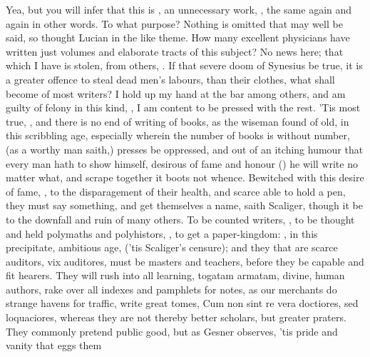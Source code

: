 {Yea, but you will infer that this is , an unnecessary
work, , the same again and again in other
words. To what purpose? Nothing is omitted that may well be said,
so thought Lucian in the like theme. How many excellent physicians have
written just volumes and elaborate tracts of this subject? No news
here; that which I have is stolen, from others, . If that severe doom of Synesius be true, it is a
greater offence to steal dead men's labours, than their clothes, what
shall become of most writers? I hold up my hand at the bar among
others, and am guilty of felony in this kind, , I
am content to be pressed with the rest. 'Tis most true, , and there is no end of
writing of books, as the wiseman found of old, in this scribbling
age, especially wherein the number of books is without number, (as
a worthy man saith,) presses be oppressed, and out of an itching humour
that every man hath to show himself, desirous of fame and honour
() he will write no matter what, and scrape
together it boots not whence. Bewitched with this desire of fame,
, to the disparagement of their health, and
scarce able to hold a pen, they must say something, and get
themselves a name, saith Scaliger, though it be to the downfall and
ruin of many others. To be counted writers, ,
to be thought and held polymaths and polyhistors, , to get a paper-kingdom: , in this precipitate, ambitious age,  ('tis
Scaliger's censure); and they that are scarce auditors, vix
auditores, must be masters and teachers, before they be capable and fit
hearers. They will rush into all learning, togatam armatam, divine,
human authors, rake over all indexes and pamphlets for notes, as our
merchants do strange havens for traffic, write great tomes, Cum non
sint re vera doctiores, sed loquaciores, whereas they are not thereby
better scholars, but greater praters. They commonly pretend public
good, but as Gesner observes, 'tis pride and vanity that eggs them
}
